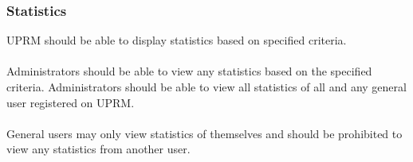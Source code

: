 \subsubsection{Statistics}
UPRM should be able to display statistics based on specified criteria.\\ \\
Administrators should be able to view any statistics based on the specified criteria. Administrators should be able to view all statistics of all and any general user registered on UPRM. \\ \\
General users may only view statistics of themselves and should be prohibited to view any statistics from another user.
